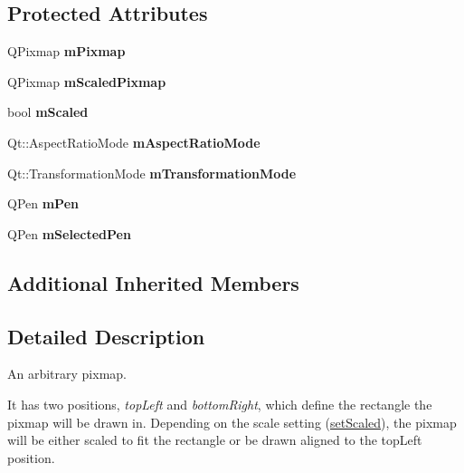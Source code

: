 \subsection*{Protected Attributes}
\begin{DoxyCompactItemize}
\item 
\mbox{\label{class_q_c_p_item_pixmap_a1396cce7f26c7b8e9512906284380c4d}} 
Q\+Pixmap {\bfseries m\+Pixmap}
\item 
\mbox{\label{class_q_c_p_item_pixmap_a2ebc66e15b9f1264563d58f29ba1bc00}} 
Q\+Pixmap {\bfseries m\+Scaled\+Pixmap}
\item 
\mbox{\label{class_q_c_p_item_pixmap_a8fe670a529cd46a9b8afd9fc1203bc3f}} 
bool {\bfseries m\+Scaled}
\item 
\mbox{\label{class_q_c_p_item_pixmap_a8dc6b6c1e106ac523efae22d5fe55bab}} 
Qt\+::\+Aspect\+Ratio\+Mode {\bfseries m\+Aspect\+Ratio\+Mode}
\item 
\mbox{\label{class_q_c_p_item_pixmap_ac9ecad3b9842363754e32eda2cf821bd}} 
Qt\+::\+Transformation\+Mode {\bfseries m\+Transformation\+Mode}
\item 
\mbox{\label{class_q_c_p_item_pixmap_acfee1124eb51a1887aaf8de10777c7a1}} 
Q\+Pen {\bfseries m\+Pen}
\item 
\mbox{\label{class_q_c_p_item_pixmap_a0949e5bb6a261fc4e9668e28e2effcfa}} 
Q\+Pen {\bfseries m\+Selected\+Pen}
\end{DoxyCompactItemize}
\subsection*{Additional Inherited Members}


\subsection{Detailed Description}
An arbitrary pixmap. 

 It has two positions, {\itshape top\+Left} and {\itshape bottom\+Right}, which define the rectangle the pixmap will be drawn in. Depending on the scale setting (\mbox{\hyperlink{class_q_c_p_item_pixmap_ab4d44529a1c6c8d37d0ea7560e042777}{set\+Scaled}}), the pixmap will be either scaled to fit the rectangle or be drawn aligned to the top\+Left position.

